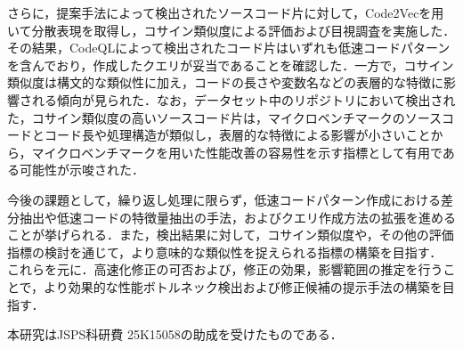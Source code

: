 \documentclass[submit,techrep,noauthor]{ipsj}
\begin{document}
さらに，提案手法によって検出されたソースコード片に対して，Code2Vecを用いて分散表現を取得し，コサイン類似度による評価および目視調査を実施した．その結果，CodeQLによって検出されたコード片はいずれも低速コードパターンを含んでおり，作成したクエリが妥当であることを確認した．一方で，コサイン類似度は構文的な類似性に加え，コードの長さや変数名などの表層的な特徴に影響される傾向が見られた．なお，データセット中のリポジトリにおいて検出された，コサイン類似度の高いソースコード片は，マイクロベンチマークのソースコードとコード長や処理構造が類似し，表層的な特徴による影響が小さいことから，マイクロベンチマークを用いた性能改善の容易性を示す指標として有用である可能性が示唆された．

今後の課題として，繰り返し処理に限らず，低速コードパターン作成における差分抽出や低速コードの特徴量抽出の手法，およびクエリ作成方法の拡張を進めることが挙げられる．また，検出結果に対して，コサイン類似度や，その他の評価指標の検討を通じて，より意味的な類似性を捉えられる指標の構築を目指す．
これらを元に．高速化修正の可否および，修正の効果，影響範囲の推定を行うことで，より効果的な性能ボトルネック検出および修正候補の提示手法の構築を目指す．

\begin{acknowledgment}
本研究はJSPS科研費 25K15058の助成を受けたものである．
\end{acknowledgment}



\end{document}
